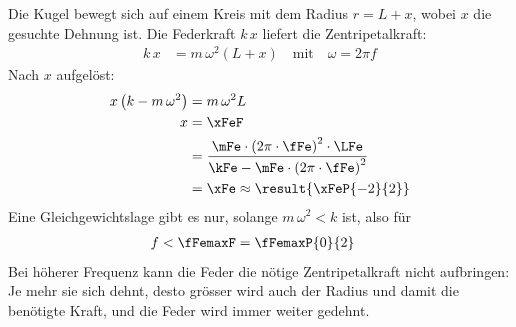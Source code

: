 \begin{center}
\end{center}

Die Kugel bewegt sich auf einem Kreis mit dem Radius $r = L + x$, wobei $x$ die gesuchte Dehnung ist. Die Federkraft $k\,x$ liefert die Zentripetalkraft:
\begin{align}
 k\,x &= m\,\omega^2\left(L + x\right) \quad\text{mit}\quad \omega = 2\pi f
\end{align}
Nach $x$ aufgelöst:
\begin{align}
 x\left(k - m\,\omega^2\right) &= m\,\omega^2 L \\
 x &= \xFeF \\
   &= \frac{\mFe\cdot\left(2\pi\cdot\fFe\right)^2\cdot\LFe}{\kFe-\mFe\cdot\left(2\pi\cdot\fFe\right)^2} \\
   &= \xFe \approx \result{\xFeP{-2}{2}}
\end{align}
Eine Gleichgewichtslage gibt es nur, solange $m\,\omega^2 < k$ ist, also für
\begin{align}
 f &< \fFemaxF = \fFemaxP{0}{2}
\end{align}
Bei höherer Frequenz kann die Feder die nötige Zentripetalkraft nicht aufbringen: Je mehr sie sich dehnt, desto grösser wird auch der Radius und damit die benötigte Kraft, und die Feder wird immer weiter gedehnt.
